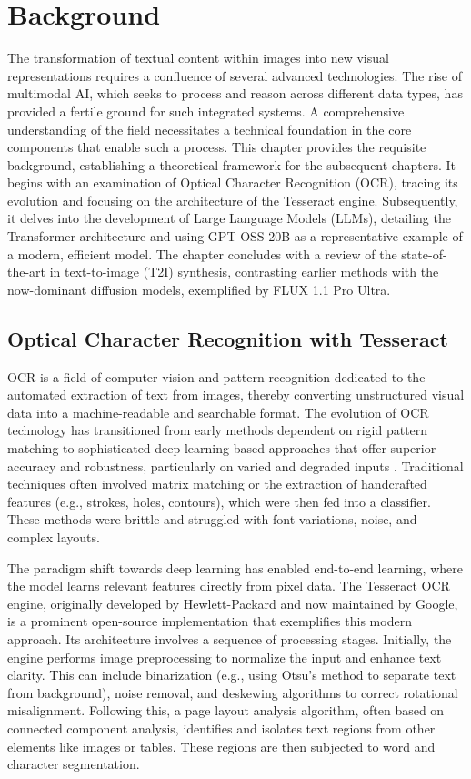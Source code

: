 \chapter{Background}
\label{chap:background}

The transformation of textual content within images into new visual representations requires a confluence of several advanced technologies. The rise of multimodal AI, which seeks to process and reason across different data types, has provided a fertile ground for such integrated systems. A comprehensive understanding of the field necessitates a technical foundation in the core components that enable such a process. This chapter provides the requisite background, establishing a theoretical framework for the subsequent chapters. It begins with an examination of Optical Character Recognition (OCR), tracing its evolution and focusing on the architecture of the Tesseract engine. Subsequently, it delves into the development of Large Language Models (LLMs), detailing the Transformer architecture and using GPT-OSS-20B as a representative example of a modern, efficient model. The chapter concludes with a review of the state-of-the-art in text-to-image (T2I) synthesis, contrasting earlier methods with the now-dominant diffusion models, exemplified by FLUX 1.1 Pro Ultra.

\section{Optical Character Recognition with Tesseract}
\label{sec:background_ocr}
OCR is a field of computer vision and pattern recognition dedicated to the automated extraction of text from images, thereby converting unstructured visual data into a machine-readable and searchable format. The evolution of OCR technology has transitioned from early methods dependent on rigid pattern matching to sophisticated deep learning-based approaches that offer superior accuracy and robustness, particularly on varied and degraded inputs \cite{esser2020improving}. Traditional techniques often involved matrix matching or the extraction of handcrafted features (e.g., strokes, holes, contours), which were then fed into a classifier. These methods were brittle and struggled with font variations, noise, and complex layouts.

The paradigm shift towards deep learning has enabled end-to-end learning, where the model learns relevant features directly from pixel data. The Tesseract OCR engine, originally developed by Hewlett-Packard and now maintained by Google, is a prominent open-source implementation that exemplifies this modern approach. Its architecture involves a sequence of processing stages. Initially, the engine performs image preprocessing to normalize the input and enhance text clarity. This can include binarization (e.g., using Otsu's method to separate text from background), noise removal, and deskewing algorithms to correct rotational misalignment. Following this, a page layout analysis algorithm, often based on connected component analysis, identifies and isolates text regions from other elements like images or tables. These regions are then subjected to word and character segmentation.

